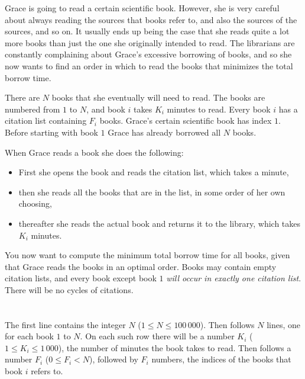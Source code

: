 \ifx\boi\undefined\fi
\def\version{jury-1}

Grace is going to read a certain scientific book.
However, she is very careful about always reading the sources that books refer
to, and also the sources of the sources, and so on.
It usually ends up being the case that she reads quite a lot more books than
just the one she originally intended to read.
The librarians are constantly complaining about Grace's excessive borrowing of
books, and so she now wants to find an order in which to read the books that
minimizes the total borrow time.

There are $N$ books that she eventually will need to read.
The books are numbered from $1$ to $N$, and book $i$ takes $K_i$ minutes to read.
Every book $i$ has a citation list containing $F_i$ books.
Grace's certain scientific book has index $1$.
Before starting with book $1$ Grace has already borrowed all $N$ books.

When Grace reads a book she does the following:

\begin{itemize}
\item First she opens the book and reads the citation list, which takes a minute,
\item then she reads all the books that are in the list, in some order of her own choosing,
\item thereafter she reads the actual book and returns it to the library, which takes $K_i$ minutes.
\end{itemize}

You now want to compute the minimum total borrow time for all books, given that Grace reads the books in an optimal order.
Books may contain empty citation lists, and every book except book $1$ {\em will occur in exactly one citation list}.
There will be no cycles of citations.

\section*{}
The first line contains the integer $N$ ($1 \le N \le 100\,000$).
Then follows $N$ lines, one for each book $1$ to $N$.
On each such row there will be a number $K_i$ ($1 \le K_i \le 1\,000$), the number of minutes the book takes to read.
Then follows a number $F_i$ ($0 \le F_i < N$), followed by $F_i$ numbers, the indices of the books that book $i$ refers to.

